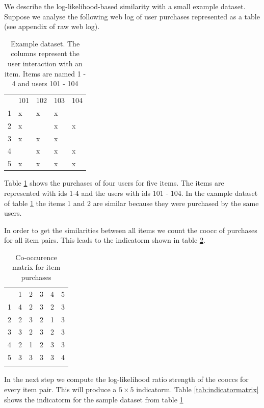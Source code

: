 We describe the log-likelihood-based similarity with a small example dataset. Suppose we analyse the following web log of user purchases represented as a table (see appendix of raw web log).

\begin{table}
\begin{center}
\begin{tabular}{rllll}
 & 101 & 102 & 103 & 104\\
1 & x & x & x &  \\
2 & x &   & x & x\\
3 & x & x & x &  \\
4 &   & x & x & x\\
5 & x & x & x & x\\
\end{tabular}
\end{center}
\caption{Example dataset. The columns represent the user interaction with an item. Items are named 1 - 4 and users 101 - 104}
\label{tbl:llr}
\end{table}

Table \ref{tbl:llr} shows the purchases of four users for five items. The items are represented with ids 1-4 and the users with ids 101 - 104.
In the example dataset of table \ref{tbl:llr} the items 1 and 2 are similar because they were purchased by the same users. 

In order to get the similarities between all items we count the \gls{coocc} of purchases for all item pairs. This leads to the \gls{indicatorm} shown in table \ref{tab:cooccurencematrix}.

\begin{table}
  \centering
\begin{center}
\begin{tabular}{rrrrrr}
  & 1 & 2 & 3 & 4 & 5\\
1 & 4 & 2 & 3 & 2 & 3\\
2 & 2 & 3 & 2 & 1 & 3\\
3 & 3 & 2 & 3 & 2 & 3\\
4 & 2 & 1 & 2 & 3 & 3\\
5 & 3 & 3 & 3 & 3 & 4\\
 &  &  &  &  & \\
\end{tabular}
\end{center}
  \caption{Co-occurence matrix for item purchases}
  \label{tab:cooccurencematrix}
\end{table}

In the next step we compute the log-likelihood ratio strength of the \glspl{coocc} for every item pair. This will produce a $5 \times 5$ \gls{indicatorm}. Table \ref{tab:indicatormatrix} shows the \gls{indicatorm} for the sample dataset from table \ref{tbl:llr}


